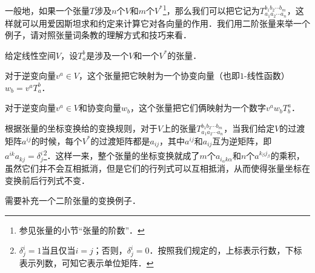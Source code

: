 一般地，如果一个张量$T$涉及$n$个$V$和$m$个$V^*$\footnote{参见张量的小节“张量的阶数”．}，那么我们可以把它记为$T^{b_1b_2\cdots b_m}_{a_1a_2\cdots a_n}$，这样就可以用爱因斯坦求和约定来计算它对各向量的作用．我们用二阶张量来举一个例子，请对照张量词条教的理解方式和技巧来看．

\begin{example}{}
给定线性空间$V$，设$T^b_a$是涉及一个$V$和一个$V^*$的张量．

对于逆变向量$v^a\in V$，这个张量把它映射为一个协变向量（也即$1$-线性函数）$w_b=v^aT^b_a$．

对于逆变向量$v^a\in V$和协变向量$w_b$，这个张量把它们俩映射为一个数字$v^aw_bT^a_b$．
\end{example}

根据张量的坐标变换给的变换规则，对于$V$上的张量$T^{b_1b_2\cdots b_m}_{a_1a_2\cdots a_n}$，当我们给定$V$的过渡矩阵$a^{ij}$的时候，每个$V^*$的过渡矩阵都是$a_{ij}$，其中$a^{ij}$和$a_{ij}$互为逆矩阵，即$a^{ik}a_{kj}=\delta^i_j$\footnote{$\delta^i_j=1$当且仅当$i=j$；否则，$\delta^i_j=0$．按照我们规定的，上标表示行数，下标表示列数，可知它表示单位矩阵．}．这样一来，整个张量的坐标变换就成了$m$个$a_{i_\alpha k\alpha}$和$n$个$a^{k_\beta j_\beta}$的乘积，虽然它们并不会互相抵消，但是它们的行列式可以互相抵消，从而使得张量坐标在变换前后行列式不变．


\begin{issues}
需要补充一个二阶张量的变换例子．
\end{issues}















